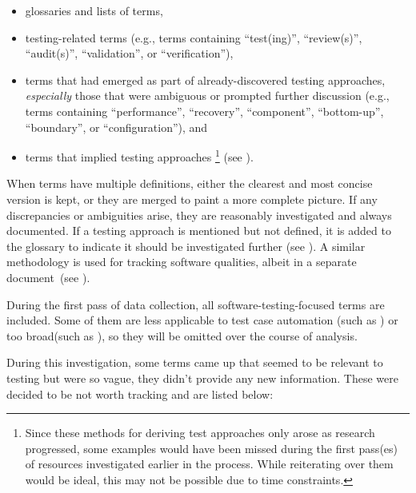 \begin{itemize}
    \item glossaries and lists of terms,
    \item testing-related terms (e.g., terms containing ``test(ing)'',
          \ifnotpaper ``review(s)'', ``audit(s)'', \fi
          ``validation'', or ``verification''),
    \item terms that had emerged as part of already-discovered
          testing approaches, \emph{especially} those that were ambiguous
          or prompted further discussion (e.g., terms containing
          ``performance'', ``recovery'', ``component'', ``bottom-up'',
          \ifnotpaper ``boundary'', \fi or ``configuration''), and
    \item terms that implied testing approaches%
          \ifnotpaper\footnote{
                  Since these methods for deriving test approaches only arose
                  as research progressed, some examples would have been missed
                  during the first pass(es) of resources investigated earlier
                  in the process. While reiterating over them would be ideal,
                  this may not be possible due to time constraints.
              } (see )\fi.
\end{itemize}

When terms have multiple definitions, either the clearest and most concise
version is kept, or they are merged to paint a more complete picture.
If any discrepancies or ambiguities
arise, they are reasonably investigated and always documented. If a
testing approach is mentioned but not defined, it is added to the
glossary to indicate it should be investigated further (see
). A similar methodology
is used for tracking software qualities, albeit in a separate
document\ifnotpaper\ (see )\fi.

During the first pass of data collection, all software-testing-focused terms
are included. Some of them are less applicable to test case automation
\ifnotpaper(such as ) \fi or too
broad\ifnotpaper (such as )\fi, so they
will be omitted over the course of analysis.

\ifnotpaper
    During this investigation, some terms came up that seemed to be relevant to
    testing but were so vague, they didn't provide any new information. These were
    decided to be not worth tracking and are listed below:

